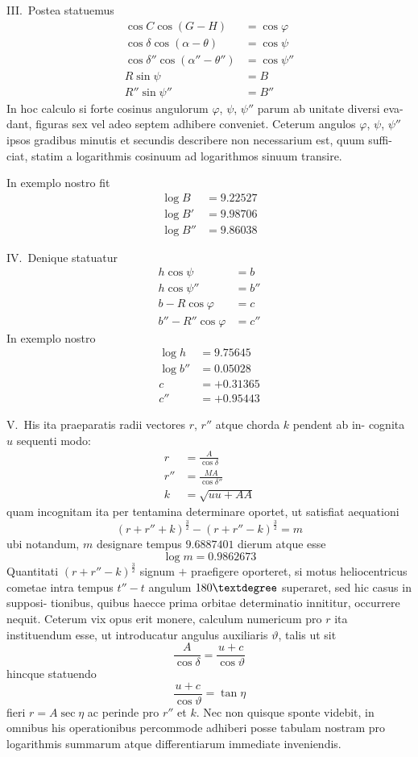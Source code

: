 \documentclass[12pt,a4paper]{article}
\begin{document}
III.\ Postea statuemus
\begin{align*}
\cos C\cos(G - H) &= \cos\varphi \\
\cos\delta\cos(\alpha - \theta) &= \cos\psi \\
\cos\delta''\cos(\alpha'' - \theta'') &= \cos\psi'' \\
R\sin\psi &= B \\
R''\sin\psi'' &= B''
\end{align*}
In hoc calculo si forte cosinus angulorum $\varphi$, $\psi$, $\psi''$ parum ab unitate diversi eva-
dant, figuras sex vel adeo septem adhibere conveniet. Ceterum angulos $\varphi$, $\psi$, $\psi''$
ipsos gradibus minutis et secundis describere non necessarium est, quum suffi-
ciat, statim a logarithmis cosinuum ad logarithmos sinuum transire.

In exemplo nostro fit
\begin{align*}
\log B &= 9.22527 \\
\log B' &= 9.98706 \\
\log B'' &= 9.86038
\end{align*}

IV.\ Denique statuatur
\begin{align*}
h\cos\psi &= b \\
h\cos\psi'' &= b'' \\
b - R\cos\varphi &= c \\
b'' - R''\cos\varphi &= c''
\end{align*}
In exemplo nostro
\begin{align*}
\log h &= 9.75645 \\
\log b'' &= 0.05028 \\
c &= +0.31365 \\
c'' &= +0.95443
\end{align*}

V.\ His ita praeparatis radii vectores $r$, $r''$ atque chorda $k$ pendent ab in-
cognita $u$ sequenti modo:
\begin{align*}
r &= \frac{A}{\cos\delta} \\
r'' &= \frac{MA}{\cos\delta''} \\
k &= \sqrt{uu + AA}
\end{align*}
quam incognitam ita per tentamina determinare oportet, ut satisfiat aequationi
\[
(r + r'' + k)^{\frac{3}{2}} - (r + r'' - k)^{\frac{3}{2}} = m
\]
ubi notandum, $m$ designare tempus $9.6887401$ dierum atque esse
\[
\log m = 0.9862673
\]
Quantitati $(r + r'' - k)^{\frac{3}{2}}$ signum $+$ praefigere oporteret, si motus heliocentricus
cometae intra tempus $t'' - t$ angulum $180\textdegree$ superaret, sed hic casus in supposi-
tionibus, quibus haecce prima orbitae determinatio innititur, occurrere nequit.
Ceterum vix opus erit monere, calculum numericum pro $r$ ita instituendum esse,
ut introducatur angulus auxiliaris $\vartheta$, talis ut sit
\[
\frac{A}{\cos\delta} = \frac{u + c}{\cos\vartheta}
\]
hincque statuendo
\[
\frac{u + c}{\cos\vartheta} = \tan\eta
\]
fieri $r = A\sec\eta$ ac perinde pro $r''$ et $k$. Nec non quisque sponte videbit,
in omnibus his operationibus percommode adhiberi posse tabulam nostram pro
logarithmis summarum atque differentiarum immediate inveniendis.
\end{document}
